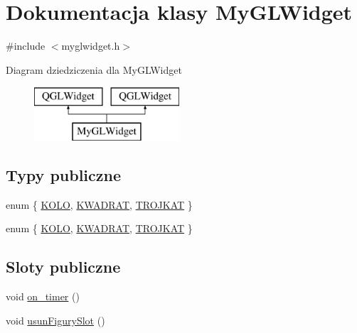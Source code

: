 \hypertarget{classMyGLWidget}{\section{Dokumentacja klasy My\-G\-L\-Widget}
\label{classMyGLWidget}
}


{\ttfamily \#include $<$myglwidget.\-h$>$}

Diagram dziedziczenia dla My\-G\-L\-Widget\begin{figure}[H]
\begin{center}
\leavevmode
\includegraphics[height=2.000000cm]{classMyGLWidget}
\end{center}
\end{figure}
\subsection*{Typy publiczne}
\begin{DoxyCompactItemize}
\item 
enum \{ \hyperlink{classMyGLWidget_a349b4124c85266bef75a190246dca82eafafafccf4bbe772769c94573d5f3101e}{K\-O\-L\-O}, 
\hyperlink{classMyGLWidget_a349b4124c85266bef75a190246dca82ea83219b17f1da7d6ff531f1f616f1f497}{K\-W\-A\-D\-R\-A\-T}, 
\hyperlink{classMyGLWidget_a349b4124c85266bef75a190246dca82ead114f07fe7235d3994ecc8e8270ffbdf}{T\-R\-O\-J\-K\-A\-T}
 \}
\item 
enum \{ \hyperlink{classMyGLWidget_a349b4124c85266bef75a190246dca82eafafafccf4bbe772769c94573d5f3101e}{K\-O\-L\-O}, 
\hyperlink{classMyGLWidget_a349b4124c85266bef75a190246dca82ea83219b17f1da7d6ff531f1f616f1f497}{K\-W\-A\-D\-R\-A\-T}, 
\hyperlink{classMyGLWidget_a349b4124c85266bef75a190246dca82ead114f07fe7235d3994ecc8e8270ffbdf}{T\-R\-O\-J\-K\-A\-T}
 \}
\end{DoxyCompactItemize}
\subsection*{Sloty publiczne}
\begin{DoxyCompactItemize}
\item 
void \hyperlink{classMyGLWidget_ad0fe9c70e007c3ff7365083a9a4586ff}{on\-\_\-timer} ()
\item 
void \hyperlink{classMyGLWidget_ae42f967e5429aed3210ecffbe68ed537}{usun\-Figury\-Slot} ()
\end{DoxyCompactItemize}
